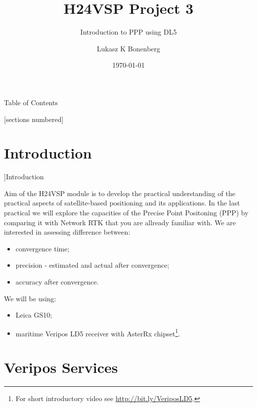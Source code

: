 \documentclass[11pt]{beamer}
\title[H24VSP]{H24VSP Project 3}
\subtitle{Introduction to PPP using DL5}
\author{Lukasz K Bonenberg}
\institute{NGI}
\date{\today}
\begin{document}
\maketitle

\begin{frame}{Table of Contents}

  [sections numbered]
  \tableofcontents[hideallsubsections]
\end{frame}


\section{Introduction}

\begin{frame}[allowframebreaks=0.8]]{Introduction}

	Aim of the H24VSP module is to develop the practical understanding of the practical aspects of
satellite-based positioning and its applications. In the last practical we will explore the capacities of the Precise Point Positoning (PPP) by comparing it with Network RTK that you are allready familiar with. We are interested in assessing difference between:
	\begin{itemize}
		\item convergence time;
		\item precision - estimated and actual after convergence; 
		\item accuracy after convergence.
	\end{itemize}
	
	We will be using:
	\begin{itemize}
		\item Leica GS10;
		\item maritime Veripos LD5 receiver with AsterRx chipset\footnote[frame]{For short introductory video see \url{http://bit.ly/VeriposLD5}.}.
	\end{itemize}
\end{frame}

\section{Veripos Services}
\end{document}
